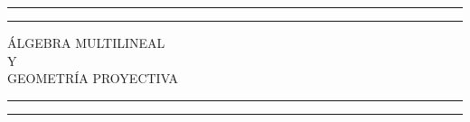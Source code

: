 \newcommand{\plogo}{\fbox{$\mathcal{PL}$}} %

\begin{titlepage} %

	\centering %

	\scshape %

	\vspace*{\baselineskip} %


	\rule{\textwidth}{1.6pt}\vspace*{-\baselineskip}\vspace*{2pt} %
	\rule{\textwidth}{0.4pt} %

	\vspace{0.75\baselineskip} %

	{\LARGE ÁLGEBRA MULTILINEAL\\ Y\\ GEOMETRÍA PROYECTIVA\\} %

	\vspace{0.75\baselineskip} %

	\rule{\textwidth}{0.4pt}\vspace*{-\baselineskip}\vspace{3.2pt} %
	\rule{\textwidth}{1.6pt} %

	\vspace{2\baselineskip} %



	\vspace*{3\baselineskip} %




	\vspace{1.5\baselineskip} %


\end{titlepage}
